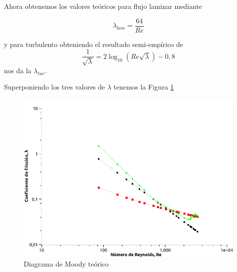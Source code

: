 \documentclass[a4paper,12pt,spanish]{article}
\begin{document}
	\vspace{\baselineskip}
	\vspace{\baselineskip}
	
	
	Ahora obtenemos los valores teóricos para flujo laminar mediante
	
	\[\lambda_{lam} = \frac{64}{Re}
	\]
	
	y para turbulento obteniendo el resultado semi-empírico de 
	\[\frac{1}{\sqrt{\lambda}} = 2 \log_{10}(Re\sqrt{\lambda})- 0,8
	\]
	nos da la $\lambda_{tur}$.
	
	Superponiendo los tres valores de $\lambda$ tenemos la Figura \ref{fig:moodyteoricosuperpuesto}
	
	
	
	
	
\begin{figure}[H]
	\centering
	\includegraphics[width=\linewidth]{../moody_teorico_superpuesto}
	\caption{Diagrama de Moody teórico}
	\label{fig:moodyteoricosuperpuesto}
\end{figure}
	
	
	
\end{document}
